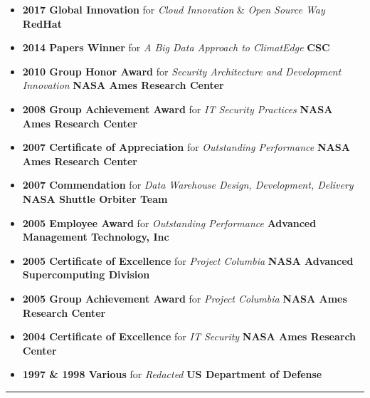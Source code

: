 \begin{itemize}
	\parskip=0.1em
	\item
	\headerrow
		{\textbf{2017 Global Innovation} for {\emph{Cloud Innovation}} \& {\emph{Open Source Way}}}
		{\textbf{RedHat}}
  \item
	\headerrow
		{\textbf{2014 Papers Winner} for {\emph{A Big Data Approach to ClimatEdge\texttrademark}}}
		{\textbf{CSC}}

	\item
	\headerrow
		{\textbf{2010 Group Honor Award} for {\emph{Security Architecture and Development Innovation}}}
		{\textbf{NASA Ames Research Center}}

	\item
	\headerrow
		{\textbf{2008 Group Achievement Award} for {\emph{IT Security Practices}} }
		{\textbf{NASA Ames Research Center}}

	\item
	\headerrow
		{\textbf{2007 Certificate of Appreciation} for {\emph{Outstanding Performance}}}
		{\textbf{NASA Ames Research Center}}

	\item
	\headerrow
		{\textbf{2007 Commendation} for {\emph{Data Warehouse Design, Development, Delivery}} }
		{\textbf{NASA Shuttle Orbiter Team}}

	\item
	\headerrow
		{\textbf{2005 Employee Award} for {\emph{Outstanding Performance}} }
		{\textbf{Advanced Management Technology, Inc}}

	\item
	\headerrow
		{\textbf{2005 Certificate of Excellence} for {\emph{Project Columbia}}}
		{\textbf{NASA Advanced Supercomputing Division}}

	\item
	\headerrow
		{\textbf{2005 Group Achievement Award} for {\emph{Project Columbia}}}
		{\textbf{NASA Ames Research Center}}

	\item
	\headerrow
		{\textbf{2004 Certificate of Excellence} for {\emph{IT Security}}}
		{\textbf{NASA Ames Research Center}}

	\item
	\headerrow
		{\textbf{1997 \& 1998 Various} for {\emph{Redacted}}}
		{\textbf{US Department of Defense}}
    
\end{itemize}

\hrule
\vspace{-0.4em}

